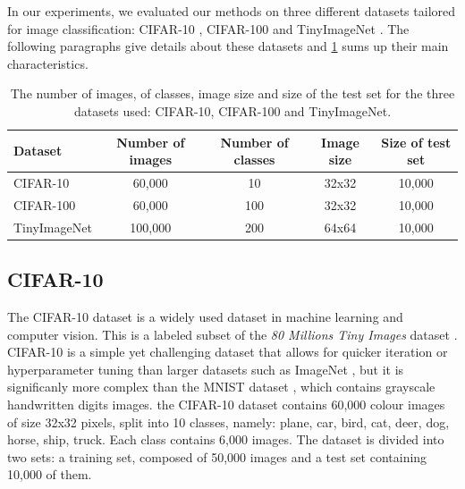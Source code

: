 In our experiments, we evaluated our methods on three different datasets
tailored for image classification: CIFAR-10 \cite{CIFARdataset}, CIFAR-100
\cite{CIFARdataset} and TinyImageNet \cite{TinyImageNet}. The following
paragraphs give details about these datasets and \cref{tab:dlo:datasets} sums
up their main characteristics.\\

\begin{table}[ht!]
  \centering
  \begin{tabular}{lcccc}
    \toprule
    \textbf{Dataset}    & \textbf{Number of images} & \textbf{Number of classes} &
    \textbf{Image size} & \textbf{Size of test set}                                               \\
    \hline
    CIFAR-10            & 60,000                    & 10                         & 32x32 & 10,000 \\
    CIFAR-100           & 60,000                    & 100                        & 32x32 & 10,000 \\
    TinyImageNet        & 100,000                   & 200                        & 64x64 & 10,000 \\
    \bottomrule
  \end{tabular}
  \caption{The number of images, of classes, image size and size of the test
    set for the three datasets used: CIFAR-10, CIFAR-100 and TinyImageNet.}
  \label{tab:dlo:datasets}
\end{table}

\subsection{CIFAR-10}

The CIFAR-10 dataset \cite{CIFARdataset} is a widely
used dataset in machine learning and computer vision. This is a labeled subset
of the \emph{80 Millions Tiny Images} dataset \cite{4531741}. CIFAR-10 is a
simple yet challenging dataset that allows for quicker iteration or
hyperparameter tuning than larger datasets such as ImageNet
\cite{DBLP:journals/ijcv/RussakovskyDSKS15}, but it is significanly more complex
than the MNIST dataset \cite{6296535}, which contains grayscale handwritten
digits images. the CIFAR-10 dataset contains 60,000 colour images of size 32x32
pixels, split into 10 classes, namely: plane, car, bird, cat, deer, dog, horse,
ship, truck. Each class contains 6,000 images. The dataset is divided into two
sets: a training set, composed of 50,000 images and a test set containing 10,000
of them.\\


